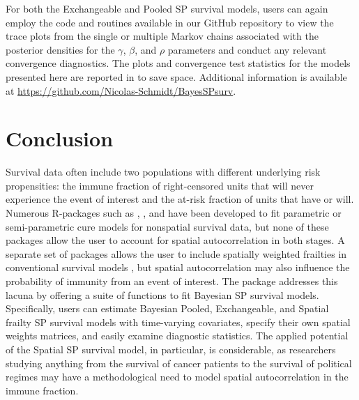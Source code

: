 For both the Exchangeable and Pooled SP survival models, users can again employ the code and routines available in our GitHub repository to view the trace plots from the single or multiple Markov chains associated with the posterior densities for the $\gamma$, $\beta$, and $\rho$ parameters and conduct any relevant convergence diagnostics. The plots and convergence test statistics for the models presented here are reported in \citet{Bolte2021} to save space. Additional information is available at \url{https://github.com/Nicolas-Schmidt/BayesSPsurv}. 

\section{Conclusion}
Survival data often include two populations with different underlying risk propensities: the immune fraction of right-censored units that will never experience the event of interest and the at-risk fraction of units that have or will. Numerous R-packages such as , , and  have been developed to fit parametric or semi-parametric cure models for nonspatial survival data, but none of these packages allow the user to account for spatial autocorrelation in both stages. A separate set of packages allows the user to include spatially weighted frailties in conventional survival models \citep{taylor2017spatsurv, spBayesSurv-article}, but spatial autocorrelation may also influence the probability of immunity from an event of interest. The  package addresses this lacuna by offering a suite of functions to fit Bayesian SP survival models. Specifically, users can estimate Bayesian Pooled, Exchangeable, and Spatial frailty SP survival models with time-varying covariates, specify their own spatial weights matrices, and easily examine diagnostic statistics. The applied potential of the Spatial SP survival model, in particular, is considerable, as researchers studying anything from the survival of cancer patients to the survival of political regimes may have a methodological need to model spatial autocorrelation in the immune fraction. 

